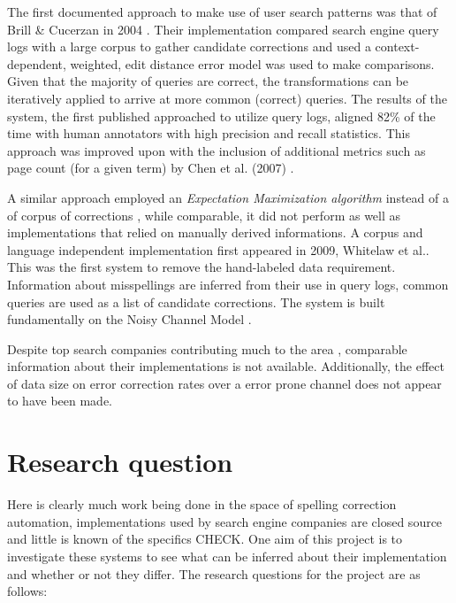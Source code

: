 \documentclass{csfourzero}
\begin{document}
The first documented approach to make use of user search patterns was that of Brill \& Cucerzan in 2004 \cite{webuserpoweredspelling}. Their implementation compared search engine query logs  with a large corpus to gather candidate corrections and used a context-dependent, weighted, edit distance error model was used to make comparisons. Given that the majority of queries are correct, the transformations can be iteratively applied to arrive at more common (correct) queries. The results of the system, the first published approached to utilize query logs, aligned 82\% of the time with human annotators with high precision and recall statistics. This approach was improved upon with the inclusion of additional metrics such as page count (for a given term) by Chen et al. (2007) \cite{webuser3}.

A similar approach employed an \textit{Expectation Maximization algorithm} instead of a of corpus of corrections \cite{webuser2learningerrormodel}, while comparable, it did not perform as well as implementations that relied on manually derived informations. A corpus and language independent implementation first appeared in 2009, Whitelaw et al.\cite{webuser4google2009}. This was the first system to remove the hand-labeled data requirement. Information about misspellings are inferred from their use in query logs, common queries are used as a list of candidate corrections. The system is built fundamentally on the Noisy Channel Model \cite{claudeshannon1948}.

Despite top search companies contributing much to the area \cite{microranker, webuser3, webuserpoweredspelling, microranker, microphone, webuser4google2009}, comparable information about their implementations is not available. Additionally, the effect of data size on error correction rates over a error prone channel does not appear to have been made.


\section{Research question}
\label{sec:rq}

Here is clearly much work being done in the space of spelling correction automation, implementations used by search engine companies are closed source and little is known of the specifics CHECK. One aim of this project is to investigate these systems to see what can be inferred about their implementation and whether or not they differ. The research questions for the project are as follows:
\end{document}
